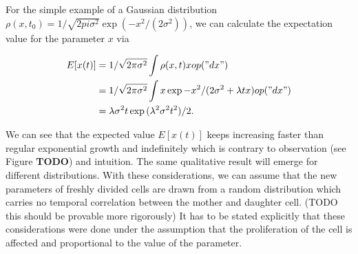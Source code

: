 \documentclass{article}
\begin{document}
For the simple example of a Gaussian distribution
$\rho(x,t_0) = 1/\sqrt{2 pi \sigma^2} \exp(-x^2/(2 \sigma^2))$, we can calculate the expectation
value for the parameter $x$ via

\begin{align}
    E[x(t)]
    &= 1/\sqrt{2 \pi \sigma^2} \int \rho(x,t) x op("dx")\\
    &= 1/\sqrt{2 \pi \sigma^2} \int x \exp{-x^2/(2 \sigma^2} + \lambda t x) op("dx")\\
    &= \lambda \sigma^2 t \exp{(\lambda^2 \sigma^2 t^2)/2}.
\end{align}

We can see that the expected value $E[x(t)]$ keeps increasing faster than regular exponential growth
and indefinitely which is contrary to observation (see Figure \textbf{TODO}) and intuition.
The same qualitative result will emerge for different distributions.
With these considerations, we can assume that the new parameters of freshly divided cells are drawn
from a random distribution which carries no temporal correlation between the mother and daughter
cell. (TODO this should be provable more rigorously)
It has to be stated explicitly that these considerations were done under the assumption that the
proliferation of the cell is affected and proportional to the value of the parameter.
\end{document}
